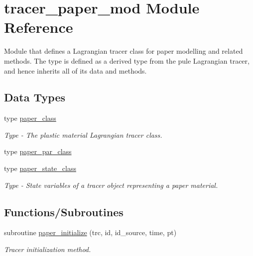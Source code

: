 \hypertarget{namespacetracer__paper__mod}{}\section{tracer\+\_\+paper\+\_\+mod Module Reference}
\label{namespacetracer__paper__mod}


Module that defines a Lagrangian tracer class for paper modelling and related methods. The type is defined as a derived type from the pule Lagrangian tracer, and hence inherits all of it\textquotesingle{}s data and methods.  


\subsection*{Data Types}
\begin{DoxyCompactItemize}
\item 
type \hyperlink{structtracer__paper__mod_1_1paper__class}{paper\+\_\+class}
\begin{DoxyCompactList}\small\item\em Type -\/ The plastic material Lagrangian tracer class. \end{DoxyCompactList}\item 
type \hyperlink{structtracer__paper__mod_1_1paper__par__class}{paper\+\_\+par\+\_\+class}
\item 
type \hyperlink{structtracer__paper__mod_1_1paper__state__class}{paper\+\_\+state\+\_\+class}
\begin{DoxyCompactList}\small\item\em Type -\/ State variables of a tracer object representing a paper material. \end{DoxyCompactList}\end{DoxyCompactItemize}
\subsection*{Functions/\+Subroutines}
\begin{DoxyCompactItemize}
\item 
subroutine \hyperlink{namespacetracer__paper__mod_a4e3b16f967d34cd206499188e17ac4f2}{paper\+\_\+initialize} (trc, id, id\+\_\+source, time, pt)
\begin{DoxyCompactList}\small\item\em Tracer initialization method. \end{DoxyCompactList}\end{DoxyCompactItemize}


